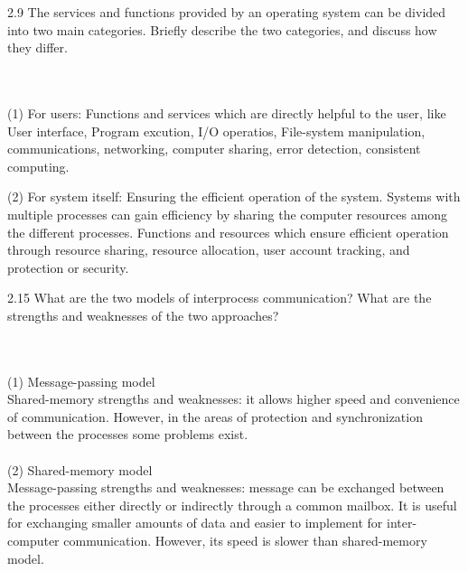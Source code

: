 \documentclass[12pt]{article}
\newenvironment{sol}[1][Solution]{\begin{trivlist}\item[\hskip\labelsep {\bfseries #1:}]}{\end{trivlist}}
\begin{document}
\begin{enumerate}
    \item 2.9 The services and functions provided by an operating system can be divided into two main categories. Briefly describe the two categories, and discuss how they differ.
    \begin{sol}
    \hspace*{\fill} \\
    \\
    (1) For users: Functions and services which are directly helpful to the user, like User interface, Program excution, I/O operatios, File-system manipulation, communications, networking, computer sharing, error detection, consistent computing.
    
(2) For system itself: Ensuring the efficient operation of the system. Systems with multiple processes can gain efficiency by sharing the computer resources among the different processes. Functions and resources which ensure efficient operation through resource sharing, resource allocation, user account tracking, and protection or security.
    \end{sol}
    \newpage

    \item 2.15 What are the two models of interprocess communication? What are the strengths and weaknesses of the two approaches?
    \begin{sol}
        \hspace*{\fill} \\
        \\
    (1) Message-passing model \\
    Shared-memory strengths and weaknesses: it allows higher speed and convenience of communication. However, in the areas of protection and synchronization between the processes some problems exist.\\
    \\
    (2) Shared-memory model\\
    Message-passing strengths and weaknesses: message can be exchanged between the processes either directly or indirectly through a common mailbox. It is useful for exchanging smaller amounts of data and easier to implement for inter-computer communication. However, its speed is slower than shared-memory model.




    \end{sol}
\end{enumerate}
\end{document}
